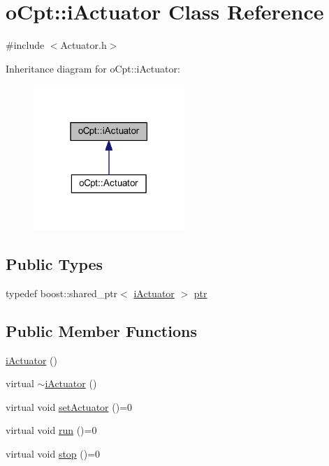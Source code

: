 \hypertarget{classo_cpt_1_1i_actuator}{}\section{o\+Cpt\+:\+:i\+Actuator Class Reference}
\label{classo_cpt_1_1i_actuator}


{\ttfamily \#include $<$Actuator.\+h$>$}



Inheritance diagram for o\+Cpt\+:\+:i\+Actuator\+:\nopagebreak
\begin{figure}[H]
\begin{center}
\leavevmode
\includegraphics[width=162pt]{classo_cpt_1_1i_actuator__inherit__graph}
\end{center}
\end{figure}
\subsection*{Public Types}
\begin{DoxyCompactItemize}
\item 
typedef boost\+::shared\+\_\+ptr$<$ \hyperlink{classo_cpt_1_1i_actuator}{i\+Actuator} $>$ \hyperlink{classo_cpt_1_1i_actuator_a35847799558e92bb84fb6c71de772cac}{ptr}
\end{DoxyCompactItemize}
\subsection*{Public Member Functions}
\begin{DoxyCompactItemize}
\item 
\hyperlink{classo_cpt_1_1i_actuator_aa54aeed96c53b59fd4caa93bc29ce615}{i\+Actuator} ()
\item 
virtual \hyperlink{classo_cpt_1_1i_actuator_a9ec8a13b323499731fcb43c728c4812e}{$\sim$i\+Actuator} ()
\item 
virtual void \hyperlink{classo_cpt_1_1i_actuator_a1654bf3167a1dd7c34f770180cd8aaa1}{set\+Actuator} ()=0
\item 
virtual void \hyperlink{classo_cpt_1_1i_actuator_abf4db1f9f6b59bdefc86ca44aed0f49a}{run} ()=0
\item 
virtual void \hyperlink{classo_cpt_1_1i_actuator_ae3f9fbb61d920bee1bd297fb5a89625e}{stop} ()=0
\end{DoxyCompactItemize}


